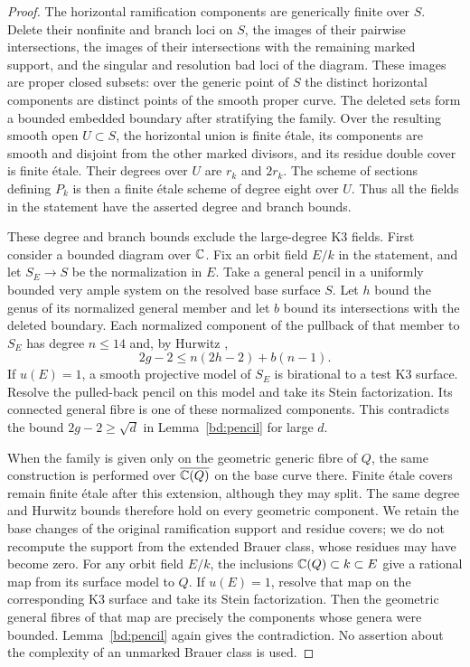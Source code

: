 \begin{proof}
The horizontal ramification components are generically finite over
$S$.  Delete their nonfinite and branch loci on $S$, the images of their
pairwise intersections, the images of their intersections with the
remaining marked support, and the singular and resolution bad loci of
the diagram.  These images are proper closed subsets: over the generic
point of $S$ the distinct horizontal components are distinct points
of the smooth proper curve.  The deleted sets form a bounded embedded
boundary after stratifying the family.  Over the resulting smooth open
$U\subset S$, the horizontal union is finite \'etale, its components are
smooth and disjoint from the other marked divisors, and its residue
double cover is finite \'etale.  Their degrees over $U$ are $r_k$ and
$2r_k$.  The scheme of sections defining $P_k$ is then a finite \'etale
scheme of degree eight over $U$.  Thus all the fields in the statement
have the asserted degree and branch bounds.

These degree and branch bounds exclude the large-degree K3 fields.
First consider a bounded diagram over $\mathbb C$.
Fix an orbit field $E/k$ in the statement, and let $S_E\to S$ be
the normalization in $E$.  Take a general pencil in a uniformly bounded
very ample system on the resolved base surface $S$.  Let $h$ bound the
genus of its normalized general member and let $b$ bound its intersections
with the deleted boundary.  Each normalized component of the pullback
of that member to $S_E$ has degree $n\leq14$ and, by Hurwitz
\cite[Lemmas~53.12.2 and~53.12.4]{StacksRiemannHurwitz2026},
\begin{equation}\label{sf:hurwitz}
                 2g-2\leq n(2h-2)+b(n-1).
\end{equation}
If $u(E)=1$, a smooth projective model of $S_E$ is birational to a
test K3 surface.  Resolve the pulled-back pencil on this model and take
its Stein factorization.  Its connected general fibre is one of these
normalized components.  This contradicts the bound
$2g-2\geq\sqrt d$ in Lemma~\ref{bd:pencil} for large $d$.

When the family is given only on the geometric generic fibre of
$Q$, the same construction is performed over
$\overline{\mathbb C(Q)}$ on the base curve there.  Finite \'etale covers remain
finite \'etale after this extension, although they may split.  The same
degree and Hurwitz bounds therefore hold on every geometric component.
We retain the base changes of the original ramification support and
residue covers; we do not recompute the support from the extended
Brauer class, whose residues may have become zero.
For any orbit field $E/k$, the inclusions $\mathbb C(Q)\subset k\subset E$
give a rational map from its surface model to $Q$.
If $u(E)=1$, resolve that map on the corresponding K3 surface and take
its Stein factorization.  Then
the geometric general fibres of that map are precisely the components
whose genera were bounded.  Lemma~\ref{bd:pencil} again gives the
contradiction.  No assertion about the complexity of an unmarked
Brauer class is used.
\end{proof}

